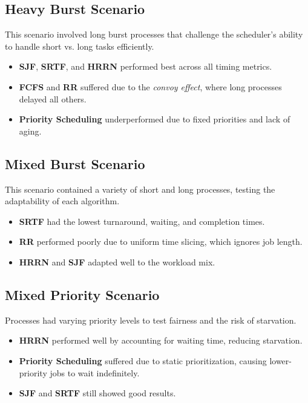 \documentclass[conference]{report}
\begin{document}
\subsection*{Heavy Burst Scenario}
This scenario involved long burst processes that challenge the scheduler’s ability to handle short vs. long tasks efficiently.

\begin{itemize}
    \item \textbf{SJF}, \textbf{SRTF}, and \textbf{HRRN} performed best across all timing metrics.
    \item \textbf{FCFS} and \textbf{RR} suffered due to the \textit{convoy effect}, where long processes delayed all others.
    \item \textbf{Priority Scheduling} underperformed due to fixed priorities and lack of aging.
\end{itemize}

\subsection*{Mixed Burst Scenario}
This scenario contained a variety of short and long processes, testing the adaptability of each algorithm.

\begin{itemize}
    \item \textbf{SRTF} had the lowest turnaround, waiting, and completion times.
    \item \textbf{RR} performed poorly due to uniform time slicing, which ignores job length.
    \item \textbf{HRRN} and \textbf{SJF} adapted well to the workload mix.
\end{itemize}

\subsection*{Mixed Priority Scenario}
Processes had varying priority levels to test fairness and the risk of starvation.

\begin{itemize}
    \item \textbf{HRRN} performed well by accounting for waiting time, reducing starvation.
    \item \textbf{Priority Scheduling} suffered due to static prioritization, causing lower-priority jobs to wait indefinitely.
    \item \textbf{SJF} and \textbf{SRTF} still showed good results.
\end{itemize}
\end{document}
